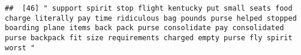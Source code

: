 \documentclass[
]{article}
\begin{document}
\begin{verbatim}
##  [46] " support spirit stop flight kentucky put small seats food charge literally pay time ridiculous bag pounds purse helped stopped boarding plane items back pack purse consolidate pay consolidated purse backpack fit size requirements charged empty purse fly spirit worst "                                                                                                                                                                                                                                                                                                                                                                                                                                                                                                                                                                                                                                                                                                                                                                                                                                                                                                                                                                                                                                                                                                                                                                                                                                                                                                                                                                                                                                                                                                                   

\end{verbatim}
\end{document}
